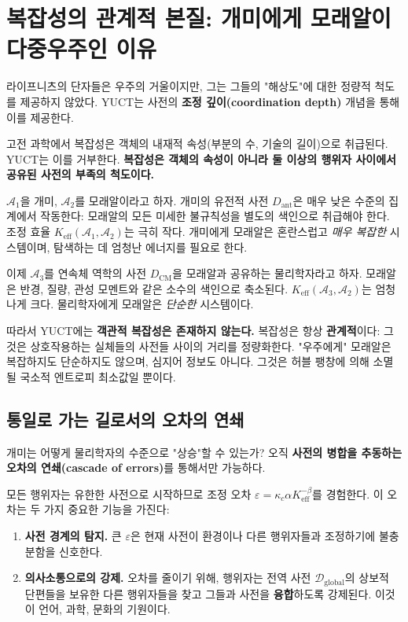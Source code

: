 \documentclass[12pt,a4paper]{article}
\newcommand{\Keff}{K_{\mathrm{eff}}}
\begin{document}
	\section{복잡성의 관계적 본질: 개미에게 모래알이 다중우주인 이유}
	\label{sec:relational-complexity}
	
	라이프니츠의 단자들은 우주의 거울이지만, 그는 그들의 "해상도"에 대한 정량적 척도를 제공하지 않았다. YUCT는 사전의 \textbf{조정 깊이(coordination depth)} 개념을 통해 이를 제공한다.
	
	고전 과학에서 복잡성은 객체의 내재적 속성(부분의 수, 기술의 길이)으로 취급된다. YUCT는 이를 거부한다. \textbf{복잡성은 객체의 속성이 아니라 둘 이상의 행위자 사이에서 공유된 사전의 부족의 척도이다.}
	
	\(\mathcal{A}_1\)을 개미, \(\mathcal{A}_2\)를 모래알이라고 하자. 개미의 유전적 사전 \(D_{\text{ant}}\)은 매우 낮은 수준의 집계에서 작동한다: 모래알의 모든 미세한 불규칙성을 별도의 색인으로 취급해야 한다. 조정 효율 \(\Keff(\mathcal{A}_1, \mathcal{A}_2)\)는 극히 작다. 개미에게 모래알은 혼란스럽고 \emph{매우 복잡한} 시스템이며, 탐색하는 데 엄청난 에너지를 필요로 한다.
	
	이제 \(\mathcal{A}_3\)를 연속체 역학의 사전 \(D_{\text{CM}}\)을 모래알과 공유하는 물리학자라고 하자. 모래알은 반경, 질량, 관성 모멘트와 같은 소수의 색인으로 축소된다. \(\Keff(\mathcal{A}_3, \mathcal{A}_2)\)는 엄청나게 크다. 물리학자에게 모래알은 \emph{단순한} 시스템이다.
	
	따라서 YUCT에는 \textbf{객관적 복잡성은 존재하지 않는다.} 복잡성은 항상 \textbf{관계적}이다: 그것은 상호작용하는 실체들의 사전들 사이의 거리를 정량화한다. "우주에게" 모래알은 복잡하지도 단순하지도 않으며, 심지어 정보도 아니다. 그것은 허블 팽창에 의해 소멸될 국소적 엔트로피 최소값일 뿐이다.
	
	\subsection{통일로 가는 길로서의 오차의 연쇄}
	\label{subsec:cascade}
	
	개미는 어떻게 물리학자의 수준으로 "상승"할 수 있는가? 오직 \textbf{사전의 병합을 추동하는 오차의 연쇄(cascade of errors)}를 통해서만 가능하다.
	
	모든 행위자는 유한한 사전으로 시작하므로 조정 오차 \(\varepsilon = \kappa_c \alpha \Keff^{-\beta}\)를 경험한다. 이 오차는 두 가지 중요한 기능을 가진다:
	
	\begin{enumerate}[leftmargin=*]
		\item \textbf{사전 경계의 탐지.} 큰 \(\varepsilon\)은 현재 사전이 환경이나 다른 행위자들과 조정하기에 불충분함을 신호한다.
		\item \textbf{의사소통으로의 강제.} 오차를 줄이기 위해, 행위자는 전역 사전 \(\mathcal{D}_{\text{global}}\)의 상보적 단편들을 보유한 다른 행위자들을 찾고 그들과 사전을 \textbf{융합}하도록 강제된다. 이것이 언어, 과학, 문화의 기원이다.
	\end{enumerate}
	
\end{document}
